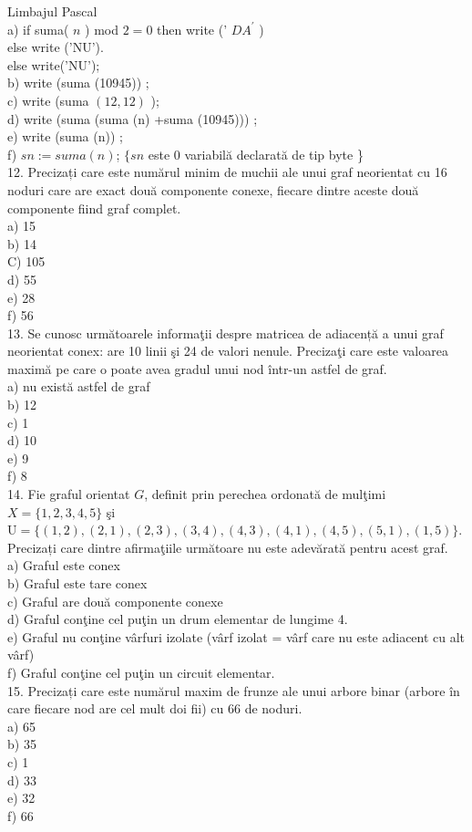 \documentclass[10pt]{article}
\begin{document}
Limbajul Pascal\\
a) if suma( $n$ ) mod $2=0$ then write (' $D A^{\prime}$ )\\
else write ('NU').\\
else write('NU');\\
b) write (suma (10945)) ;\\
c) write (suma $(12,12)$ );\\
d) write (suma (suma (n) +suma (10945))) ;\\
e) write (suma (n)) ;\\
f) $s n:=s u m a(n)$; $\{s n$ este 0 variabilă declarată de tip byte \}\\
12. Precizați care este numărul minim de muchii ale unui graf neorientat cu 16 noduri care are exact două componente conexe, fiecare dintre aceste două componente fiind graf complet.\\
a) 15\\
b) 14\\
C) 105\\
d) 55\\
e) 28\\
f) 56\\
13. Se cunosc următoarele informaţii despre matricea de adiacență a unui graf neorientat conex: are 10 linii şi 24 de valori nenule. Precizaţi care este valoarea maximă pe care o poate avea gradul unui nod într-un astfel de graf.\\
a) nu există astfel de graf\\
b) 12\\
c) 1\\
d) 10\\
e) 9\\
f) 8\\
14. Fie graful orientat $G$, definit prin perechea ordonată de mulţimi $X=\{1,2,3,4,5\}$ şi $\mathrm{U}=\{(1,2),(2,1),(2,3),(3,4),(4,3),(4,1),(4,5),(5,1),(1,5)\}$.\\
Precizați care dintre afirmaţiile următoare nu este adevărată pentru acest graf.\\
a) Graful este conex\\
b) Graful este tare conex\\
c) Graful are două componente conexe\\
d) Graful conţine cel puţin un drum elementar de lungime 4.\\
e) Graful nu conţine vârfuri izolate (vârf izolat = vârf care nu este adiacent cu alt vârf)\\
f) Graful conţine cel puţin un circuit elementar.\\
15. Precizați care este numărul maxim de frunze ale unui arbore binar (arbore în care fiecare nod are cel mult doi fii) cu 66 de noduri.\\
a) 65\\
b) 35\\
c) 1\\
d) 33\\
e) 32\\
f) 66
\end{document}
